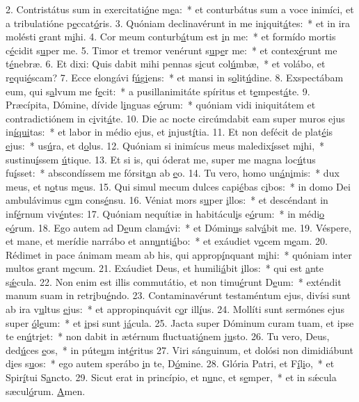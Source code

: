 2. Contristátus sum in exercitati\uline{ó}ne m\uline{e}a:~* et conturbátus sum a voce inimíci, et a tribulatióne p\uline{e}ccat\uline{ó}ris.
3. Quóniam declinavérunt in me in\uline{i}quit\uline{á}tes:~* et in ira molésti \uline{e}rant m\uline{i}hi.
4. Cor meum conturb\uline{á}tum est \uline{i}n me:~* et formído mortis c\uline{é}cidit s\uline{u}per me.
5. Timor et tremor venérunt s\uline{u}p\uline{e}r me:~* et contex\uline{é}runt me t\uline{é}nebræ.
6. Et dixi: Quis dabit mihi pennas s\uline{i}cut col\uline{ú}mbæ,~* et volábo, et r\uline{e}qui\uline{é}scam?
7. Ecce elongávi f\uline{ú}g\uline{i}ens:~* et mansi in s\uline{o}lit\uline{ú}dine.
8. Exspectábam eum, qui s\uline{a}lvum me f\uline{e}cit:~* a pusillanimitáte spíritus et t\uline{e}mpest\uline{á}te.
9. Præcípita, Dómine, dívide l\uline{i}nguas e\uline{ó}rum:~* quóniam vidi iniquitátem et contradictiónem in c\uline{i}vit\uline{á}te.
10. Die ac nocte circúmdabit eam super muros ejus in\uline{í}\uline{qui}tas:~* et labor in médio ejus, et \uline{i}njust\uline{í}tia.
11. Et non defécit de plat\uline{é}is \uline{e}jus:~* us\uline{ú}ra, et d\uline{o}lus.
12. Quóniam si inimícus meus maledix\uline{í}sset m\uline{i}hi,~* sustinu\uline{í}ssem \uline{ú}tique.
13. Et si is, qui óderat me, super me magna loc\uline{ú}tus fu\uline{í}sset:~* abscondíssem me fórsit\uline{a}n ab \uline{e}o.
14. Tu vero, homo un\uline{á}n\uline{i}mis:~* dux meus, et n\uline{o}tus m\uline{e}us.
15. Qui simul mecum dulces capi\uline{é}bas c\uline{i}bos:~* in domo Dei ambulávimus c\uline{u}m cons\uline{é}nsu.
16. Véniat mors s\uline{u}per \uline{i}llos:~* et descéndant in inf\uline{é}rnum viv\uline{é}ntes:
17. Quóniam nequítiæ in habitácul\uline{i}s e\uline{ó}rum:~* in médi\uline{o} e\uline{ó}rum.
18. Ego autem ad D\uline{e}um clam\uline{á}vi:~* et Dómin\uline{u}s salv\uline{á}bit me.
19. Véspere, et mane, et merídie narrábo et ann\uline{u}nti\uline{á}bo:~* et exáudiet v\uline{o}cem m\uline{e}am.
20. Rédimet in pace ánimam meam ab his, qui approp\uline{í}nquant m\uline{i}hi:~* quóniam inter multos \uline{e}rant m\uline{e}cum.
21. Exáudiet Deus, et humili\uline{á}bit \uline{i}llos:~* qui est \uline{a}nte s\uline{ǽ}cula.
22. Non enim est illis commutátio, et non timu\uline{é}runt D\uline{e}um:~* exténdit manum suam in retr\uline{i}bu\uline{é}ndo.
23. Contaminavérunt testaméntum ejus, divísi sunt ab ira v\uline{u}ltus \uline{e}jus:~* et appropinquávit c\uline{o}r ill\uline{í}us.
24. Mollíti sunt sermónes ejus super \uline{ó}l\uline{e}um:~* et \uline{i}psi sunt j\uline{á}cula.
25. Jacta super Dóminum curam tuam, et ipse te en\uline{ú}tr\uline{i}et:~* non dabit in ætérnum fluctuati\uline{ó}nem j\uline{u}sto.
26. Tu vero, Deus, ded\uline{ú}ces \uline{e}os,~* in púte\uline{u}m int\uline{é}ritus
27. Viri sánguinum, et dolósi non dimidiábunt d\uline{i}es s\uline{u}os:~* ego autem sperábo \uline{i}n te, D\uline{ó}mine.
28. Glória Patri, et F\uline{í}l\uline{i}o,~* et Spir\uline{í}tui S\uline{a}ncto.
29. Sicut erat in princípio, et n\uline{u}nc, et s\uline{e}mper,~* et in sǽcula sæcul\uline{ó}rum. \uline{A}men.
